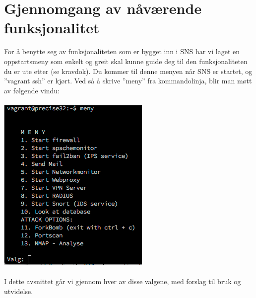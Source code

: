 \documentclass{article}
\begin{document}
\section{Gjennomgang av nåværende funksjonalitet}
For å benytte seg av funksjonaliteten som er bygget inn i SNS har vi laget en oppstartsmeny som enkelt og greit skal kunne guide deg til den funksjonaliteten du er ute etter (se kravdok). Du kommer til denne menyen når SNS er startet, og ''vagrant ssh'' er kjørt. Ved så å skrive ''meny'' fra kommandolinja, blir man møtt av følgende vindu: 
\\ \\
\includegraphics[scale=0.7]{meny.png} 
\\ \\
I dette avsnittet går vi gjennom hver av disse valgene, med forslag til bruk og utvidelse.  
\end{document}
